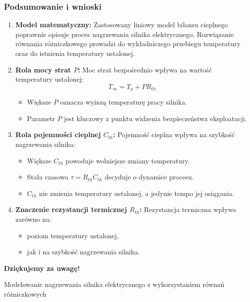 \documentclass[10pt, aspectratio=169, t]{beamer}
\begin{document}
\begin{frame}
	\frametitle{Podsumowanie i wnioski}
	
	\begin{enumerate}
		\item \textbf{Model matematyczny:}  
		Zastosowany liniowy model bilansu cieplnego poprawnie opisuje proces nagrzewania silnika elektrycznego.  
		Rozwiązanie równania różniczkowego prowadzi do wykładniczego przebiegu temperatury oraz do istnienia temperatury ustalonej.
		
		\item \textbf{Rola mocy strat $P$:}  
		Moc strat bezpośrednio wpływa na wartość temperatury ustalonej:
		\[
		T_\infty = T_a + P R_{th}
		\]
		\begin{itemize}
			\item Większe $P$ oznacza wyższą temperaturę pracy silnika.
			\item Parametr $P$ jest kluczowy z punktu widzenia bezpieczeństwa eksploatacji.
		\end{itemize}
		
		\item \textbf{Rola pojemności cieplnej $C_{th}$:}  
		Pojemność cieplna wpływa na szybkość nagrzewania silnika:
		\begin{itemize}
			\item Większe $C_{th}$ powoduje wolniejsze zmiany temperatury.
			\item Stała czasowa $\tau = R_{th} C_{th}$ decyduje o dynamice procesu.
			\item $C_{th}$ nie zmienia temperatury ustalonej, a jedynie tempo jej osiągania.
		\end{itemize}
		
		\item \textbf{Znaczenie rezystancji termicznej $R_{th}$:}  
		Rezystancja termiczna wpływa zarówno na:
		\begin{itemize}
			\item poziom temperatury ustalonej,
			\item jak i na szybkość nagrzewania silnika.
		\end{itemize}
		
	\end{enumerate}
	
\end{frame}

	
	
	
	
	
	
	\begin{frame}
		\centering
		\vspace{2cm}
		
		{\Huge \textbf{Dziękujemy za uwagę!}}
		
		\vspace{1.5cm}
		

		
		\vfill
		
		\begin{center}
			\small
			Modelowanie nagrzewania silnika elektrycznego z wykorzystaniem równań różniczkowych
		\end{center}
		
	\end{frame}
	
	
	
	
\end{document}
